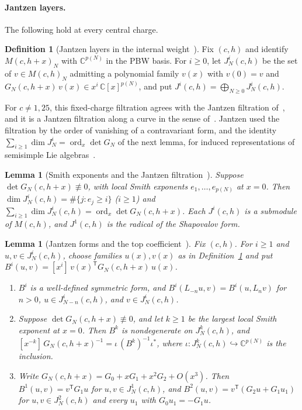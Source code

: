 \documentclass[twoside,10pt]{article}
\numberwithin{equation}{section}
\theoremstyle{slbody}
\newtheorem{lemma}[theorem]{Lemma}
\theoremstyle{definition}
\newtheorem{definition}[theorem]{Definition}
\theoremstyle{remark}
\newcommand{\ord}{\operatorname{ord}}
\begin{document}
\paragraph{Jantzen layers.}  The following hold at every central charge.

\begin{definition}[Jantzen layers in the internal weight~{\cite[Definition~5.2]{PolzerColliding2026}}]
\label{def:jantzen-layers}
Fix \((c,h)\) and identify \(M(c,h+x)_N\) with \(\mathbb C^{p(N)}\) in the PBW
basis.  For \(i\geq0\), let \(J^i_N(c,h)\) be the set of \(v\in M(c,h)_N\)
admitting a polynomial family \(v(x)\) with \(v(0)=v\) and
\(G_N(c,h+x)\,v(x)\in x^i\,\mathbb C[x]^{p(N)}\), and put
\(J^i(c,h)=\bigoplus_{N\geq0}J^i_N(c,h)\).
\end{definition}

For \(c\neq1,25\), this fixed-charge filtration agrees with the Jantzen
filtration of~\cite[\S5.5, (5.49)]{IoharaKoga2011}, and it is a Jantzen
filtration along a curve in the sense of~\cite[\S4 and \S5.2]{Astashkevich1997}.
Jantzen used the filtration by the order of vanishing of a contravariant
form, and the identity \(\sum_{i\geq1}\dim J^i_N=\ord_x\det G_N\) of the next
lemma, for induced representations of semisimple Lie
algebras~\cite[\S2, Lemma~3]{Jantzen1977}.

\begin{lemma}[Smith exponents and the Jantzen filtration~{\cite[Lemma~5.3]{PolzerColliding2026}}]
\label{lem:jantzen-smith}
Suppose \(\det G_N(c,h+x)\not\equiv0\), with local Smith exponents
\(e_1,\ldots,e_{p(N)}\) at \(x=0\).  Then
\(\dim J^i_N(c,h)=\#\{j:e_j\geq i\}\) (\(i\geq1\)) and
\(\sum_{i\geq1}\dim J^i_N(c,h)=\ord_x\det G_N(c,h+x)\).
Each \(J^i(c,h)\) is a submodule of \(M(c,h)\), and \(J^1(c,h)\) is the
radical of the Shapovalov form.
\end{lemma}

\begin{lemma}[Jantzen forms and the top coefficient~{\cite[Lemma~5.4]{PolzerColliding2026}}]
\label{lem:top-coefficient}
Fix \((c,h)\).  For \(i\geq1\) and \(u,v\in J^i_N(c,h)\), choose families
\(u(x),v(x)\) as in Definition~\ref{def:jantzen-layers} and put
\(B^i(u,v)=[x^i]\,v(x)^{\mathsf T}G_N(c,h+x)\,u(x)\).
\begin{enumerate}
\item[(i)] \(B^i\) is a well-defined symmetric form, and
\(B^i(L_{-n}u,v)=B^i(u,L_nv)\) for \(n>0\), \(u\in J^i_{N-n}(c,h)\), and
\(v\in J^i_N(c,h)\).
\item[(ii)] Suppose \(\det G_N(c,h+x)\not\equiv0\), and let \(k\geq1\) be
the largest local Smith exponent at \(x=0\).  Then \(B^k\) is
nondegenerate on \(J^k_N(c,h)\), and
\([x^{-k}]\,G_N(c,h+x)^{-1}=\iota\,(B^k)^{-1}\iota^*\),
where \(\iota\colon J^k_N(c,h)\hookrightarrow\mathbb C^{p(N)}\) is the
inclusion.
\item[(iii)] Write \(G_N(c,h+x)=G_0+xG_1+x^2G_2+O(x^3)\).  Then
\(B^1(u,v)=v^{\mathsf T}G_1u\) for \(u,v\in J^1_N(c,h)\), and
\(B^2(u,v)=v^{\mathsf T}(G_2u+G_1u_1)\) for \(u,v\in J^2_N(c,h)\) and every
\(u_1\) with \(G_0u_1=-G_1u\).
\end{enumerate}
\end{lemma}
\end{document}
